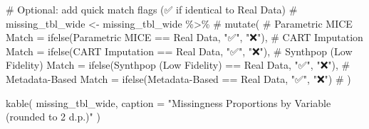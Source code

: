 \documentclass[
  letterpaper,
  DIV=11,
  numbers=noendperiod]{scrartcl}
\newenvironment{Shaded}{\begin{snugshade}}{\end{snugshade}}
\newcommand{\AttributeTok}[1]{\textcolor[rgb]{0.40,0.45,0.13}{#1}}
\newcommand{\CommentTok}[1]{\textcolor[rgb]{0.37,0.37,0.37}{#1}}
\newcommand{\FunctionTok}[1]{\textcolor[rgb]{0.28,0.35,0.67}{#1}}
\newcommand{\NormalTok}[1]{\textcolor[rgb]{0.00,0.23,0.31}{#1}}
\newcommand{\StringTok}[1]{\textcolor[rgb]{0.13,0.47,0.30}{#1}}
\begin{document}
\begin{Shaded}
\begin{Highlighting}[]
\CommentTok{\# Optional: add quick match flags (✅ if identical to Real Data)}
\CommentTok{\# missing\_tbl\_wide \textless{}{-} missing\_tbl\_wide \%\textgreater{}\%}
\CommentTok{\#   mutate(}
\CommentTok{\#     \textasciigrave{}Parametric MICE Match\textasciigrave{} = ifelse(\textasciigrave{}Parametric MICE\textasciigrave{} == \textasciigrave{}Real Data\textasciigrave{}, "✅", "❌"),}
\CommentTok{\#     \textasciigrave{}CART Imputation Match\textasciigrave{} = ifelse(\textasciigrave{}CART Imputation\textasciigrave{} == \textasciigrave{}Real Data\textasciigrave{}, "✅", "❌"),}
\CommentTok{\#     \textasciigrave{}Synthpop (Low Fidelity) Match\textasciigrave{} = ifelse(\textasciigrave{}Synthpop (Low Fidelity)\textasciigrave{} == \textasciigrave{}Real Data\textasciigrave{}, "✅", "❌"),}
\CommentTok{\#     \textasciigrave{}Metadata{-}Based Match\textasciigrave{} = ifelse(\textasciigrave{}Metadata{-}Based\textasciigrave{} == \textasciigrave{}Real Data\textasciigrave{}, "✅", "❌")}
\CommentTok{\#   )}

\FunctionTok{kable}\NormalTok{(}
\NormalTok{  missing\_tbl\_wide,}
  \AttributeTok{caption =} \StringTok{"Missingness Proportions by Variable (rounded to 2 d.p.)"}
\NormalTok{)}
\end{Highlighting}
\end{Shaded}
\end{document}
